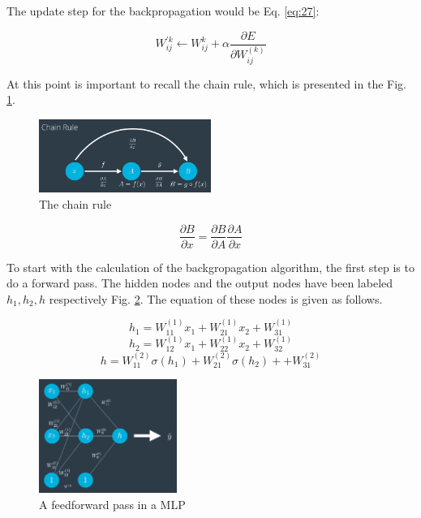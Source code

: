 \documentclass{article}
\begin{document}
The update step for the backpropagation would be Eq. \eqref{eq:27}:

\begin{equation}
\label{eq:27}
W_{ij}^{'k} \leftarrow W_{ij}^{k} + \alpha \frac{\partial E}{\partial W_{ij}^{(k)}}
\end{equation}

At this point is important to recall the chain rule, which is presented in the Fig. \ref{fig:f32}.

\begin{figure}[ht]
    \centering
    \includegraphics[width=0.5\textwidth,height=0.5\textheight,keepaspectratio]{images/chain_rule.png}
    \captionsetup{justification=centering}
    \caption{The chain rule}
    \label{fig:f32}
\end{figure}

\[\frac{\partial B}{\partial x} = \frac{\partial B}{\partial A} \frac{\partial A}{\partial x}\]

To start with the calculation of the backgropagation algorithm, the first step is to do a forward pass. The hidden nodes and the output nodes have been labeled \(h_1, h_2, h\) respectively Fig. \ref{fig:f33}. The equation of these nodes is given as follows.

\[h_1 = W_{11}^{(1)}x_1 +  W_{21}^{(1)}x_2 + W_{31}^{(1)}\]
\[h_2 = W_{12}^{(1)}x_1 +  W_{22}^{(1)}x_2 + W_{32}^{(1)}\]
\[h = W_{11}^{(2)}\sigma(h_1) + W_{21}^{(2)}\sigma(h_2) + + W_{31}^{(2)}\]

\begin{figure}[ht]
    \centering
    \includegraphics[width=0.4\textwidth,height=0.4\textheight,keepaspectratio]{images/feedforward_pass.png}
    \captionsetup{justification=centering}
    \caption{A feedforward pass in a MLP}
    \label{fig:f33}
\end{figure}
\end{document}
